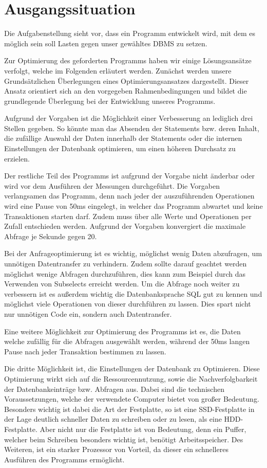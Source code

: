 \section{Ausgangssituation}
Die Aufgabenstellung sieht vor, dass ein Programm entwickelt wird, mit dem es möglich sein soll 
Lasten gegen unser gewähltes DBMS zu setzen. 

Zur Optimierung des geforderten Programms haben wir einige Lösungsansätze verfolgt, welche im 
Folgenden erläutert werden. Zunächst werden unsere Grundsätzlichen Überlegungen eines 
Optimierungsansatzes dargestellt. Dieser Ansatz orientiert sich an den vorgegeben Rahmenbedingungen 
und bildet die grundlegende Überlegung bei der Entwicklung unseres Programms.

Aufgrund der Vorgaben ist die Möglichkeit einer Verbesserung an lediglich drei Stellen gegeben. So 
könnte man das Absenden der Statements bzw. deren Inhalt, die zufällige Auswahl der Daten innerhalb 
der Statements oder die internen Einstellungen der Datenbank optimieren, um einen höheren Durchsatz 
zu erzielen.

Der restliche Teil des Programms ist aufgrund der Vorgabe nicht änderbar oder wird vor dem Ausführen 
der Messungen durchgeführt. Die Vorgaben verlangsamen das Programm, denn nach jeder der 
auszuführenden Operationen wird eine Pause von 50ms eingelegt, in welcher das Programm abwartet und 
keine Transaktionen starten darf.  Zudem muss über alle Werte und Operationen per Zufall entschieden 
werden. Aufgrund der Vorgaben konvergiert die maximale Abfrage je Sekunde gegen 20. 

Bei der Anfrageoptimierung ist es wichtig, möglichst wenig Daten abzufragen, um unnötigen 
Datentransfer zu verhindern. Zudem sollte darauf geachtet werden möglichst wenige Abfragen 
durchzuführen, dies kann zum Beispiel durch das Verwenden von Subselects erreicht werden. Um die 
Abfrage noch weiter zu verbessern ist es außerdem wichtig die Datenbanksprache SQL gut zu kennen 
und möglichst viele Operationen von dieser durchführen zu lassen. Dies spart nicht nur unnötigen 
Code ein, sondern auch Datentransfer.

Eine weitere Möglichkeit zur Optimierung des Programms ist es, die Daten welche zufällig für die 
Abfragen ausgewählt werden, während der 50ms langen Pause nach jeder Transaktion bestimmen zu 
lassen. 

Die dritte Möglichkeit ist, die Einstellungen der Datenbank zu Optimieren. Diese Optimierung wirkt 
sich auf die Ressourcennutzung, sowie die Nachverfolgbarkeit der Datenbankeinträge bzw. Abfragen 
aus. Dabei sind die technischen Voraussetzungen, welche der verwendete Computer bietet von großer 
Bedeutung. Besonders wichtig ist dabei die Art der Festplatte, so ist eine SSD-Festplatte in der 
Lage deutlich schneller Daten zu schreiben oder zu lesen, als eine HDD-Festplatte. Aber nicht nur 
die Festplatte ist von Bedeutung, denn ein Puffer, welcher beim Schreiben besonders wichtig ist, 
benötigt Arbeitsspeicher. Des Weiteren, ist ein starker Prozessor von Vorteil, da dieser ein 
schnelleres Ausführen des Programms ermöglicht.



\clearpage